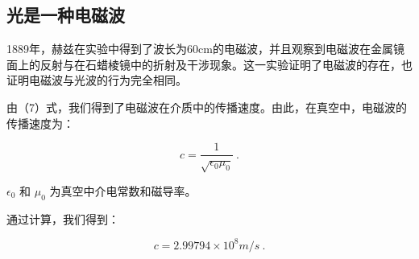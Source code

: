 \subsection{光是一种电磁波}

1889年，赫兹在实验中得到了波长为60cm的电磁波，并且观察到电磁波在金属镜面上的反射与在石蜡棱镜中的折射及干涉现象。这一实验证明了电磁波的存在，也证明电磁波与光波的行为完全相同。

由（7）式，我们得到了电磁波在介质中的传播速度。由此，在真空中，电磁波的传播速度为：

\begin{equation}
c = \frac{1}{\sqrt{\epsilon_0 \mu_0}} ~.
\end{equation}

$\epsilon_0$ 和 $\mu_0$ 为真空中介电常数和磁导率。

通过计算，我们得到：

\begin{equation}
c = 2.99794 \times 10^8 m/s ~.
\end{equation}
